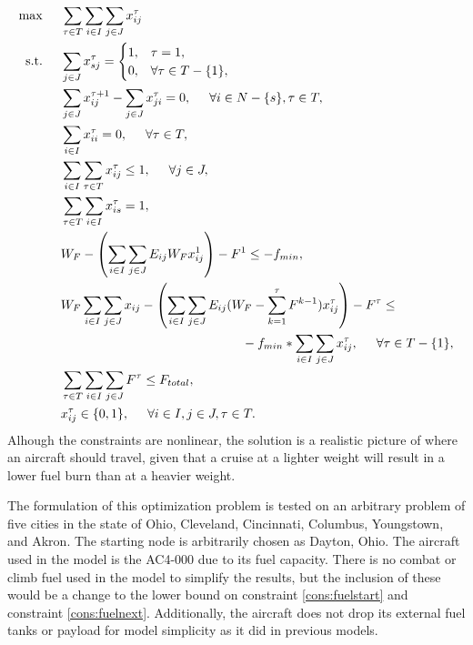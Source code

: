 \begin{align}
\max \hspace{0.5cm} & \sum_{\tau\in T}\sum_{i\in I}\sum_{j\in J}x_{ij}^\tau\\
\text{s.t.}\hspace{0.5cm}&\sum_{j\in J} x_{sj}^{\tau} = \begin{cases} 
1, & \tau = 1,\\
0, & \forall\tau\in T-\{1\}, \end{cases} \\
&\sum_{j\in J} x_{ij}^{\tau+1}-\sum_{j\in J}x^{\tau}_{ji} = 0, \hspace{0.5cm} \forall i\in N-\{s\},\tau \in T, \\
&\sum_{i\in I}x_{ii}^{\tau} = 0, \hspace{0.5cm} \forall \tau \in T, \\
&\sum_{i\in I}\sum_{\tau\in T} x_{ij}^\tau\leq 1, \hspace{0.5cm} \forall j \in J,\\
&\sum_{\tau\in T}\sum_{i\in I} x_{is}^\tau = 1,\\
&W_F-\left(\sum_{i\in I}\sum_{j\in J}E_{ij}W_Fx_{ij}^1\right) - F^{1}\leq -f_{min}, \\
&W_F\sum_{i\in I}\sum_{j\in J}x_{ij}-\left(\sum_{i\in I}\sum_{j\in J}E_{ij}(W_F-\sum_{k = 1}^{\tau}F^{k-1})x_{ij}^{\tau}\right) - F^{\tau}\leq \nonumber\\
&\hspace{5cm}-f_{min}*\sum_{i\in I}\sum_{j\in J}x_{ij}^\tau, \hspace{.5cm} \forall \tau \in T-\{1\},\\
&\sum_{\tau\in T}\sum_{i\in I}\sum_{j\in J} F^{\tau} \leq F_{total},\\
&x_{ij}^{\tau}\in \{0,1\}, \hspace{0.5cm} \forall i\in I,j\in J,\tau\in T.
\end{align}
Alhough the constraints are nonlinear, the solution is a realistic picture of where an aircraft should travel, given that a cruise at a lighter weight will result in a lower fuel burn than at a heavier weight. \par
The formulation of this optimization problem is tested on an arbitrary problem of five cities in the state of Ohio, Cleveland, Cincinnati, Columbus, Youngstown, and Akron. The starting node is arbitrarily chosen as Dayton, Ohio. The aircraft used in the model is the AC4-000 due to its fuel capacity. There is no combat or climb fuel used in the model to simplify the results, but the inclusion of these would be a change to the lower bound on constraint \eqref{cons:fuelstart} and constraint \eqref{cons:fuelnext}. Additionally, the aircraft does not drop its external fuel tanks or payload for model simplicity as it did in previous models.\par
